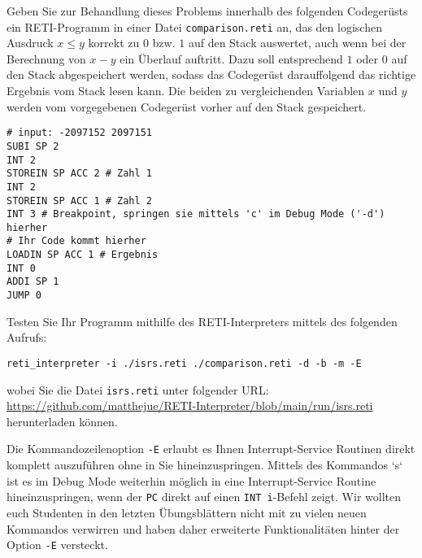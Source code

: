 \documentclass{article}
\begin{document}
Geben Sie zur Behandlung dieses Problems innerhalb des folgenden Codegerüsts ein RETI-Programm in einer Datei \verb|comparison.reti| an, das den logischen Ausdruck $x \le y$ korrekt zu $0$ bzw. $1$ auf den Stack auswertet, auch wenn bei der Berechnung von $x - y$ ein Überlauf auftritt. Dazu soll entsprechend $1$ oder $0$ auf den Stack abgespeichert werden, sodass das Codegerüst darauffolgend das richtige Ergebnis vom Stack lesen kann. Die beiden zu vergleichenden Variablen $x$ und $y$ werden vom vorgegebenen Codegerüst vorher auf den Stack gespeichert. %

\begin{verbatim}
# input: -2097152 2097151
SUBI SP 2
INT 2
STOREIN SP ACC 2 # Zahl 1
INT 2
STOREIN SP ACC 1 # Zahl 2
INT 3 # Breakpoint, springen sie mittels 'c' im Debug Mode ('-d') hierher
# Ihr Code kommt hierher
LOADIN SP ACC 1 # Ergebnis
INT 0
ADDI SP 1
JUMP 0
\end{verbatim}

Testen Sie Ihr Programm mithilfe des RETI-Interpreters mittels des folgenden Aufrufs:

\begin{verbatim}
reti_interpreter -i ./isrs.reti ./comparison.reti -d -b -m -E
\end{verbatim}

wobei Sie die Datei \verb|isrs.reti| unter folgender URL: \href{https://github.com/matthejue/RETI-Interpreter/blob/main/run/isrs.reti}{https://github.com/matthejue/RETI-Interpreter/blob/main/run/isrs.reti} herunterladen können.

Die Kommandozeilenoption \verb|-E| erlaubt es Ihnen Interrupt-Service Routinen direkt komplett auszuführen ohne in Sie hineinzuspringen. Mittels des Kommandos `s` ist es im Debug Mode weiterhin möglich in eine Interrupt-Service Routine hineinzuspringen, wenn der \verb|PC| direkt auf einen \verb|INT i|-Befehl zeigt. Wir wollten euch Studenten in den letzten Übungsblättern nicht mit zu vielen neuen Kommandos verwirren und haben daher erweiterte Funktionalitäten hinter der Option \verb|-E| versteckt.
\end{document}
